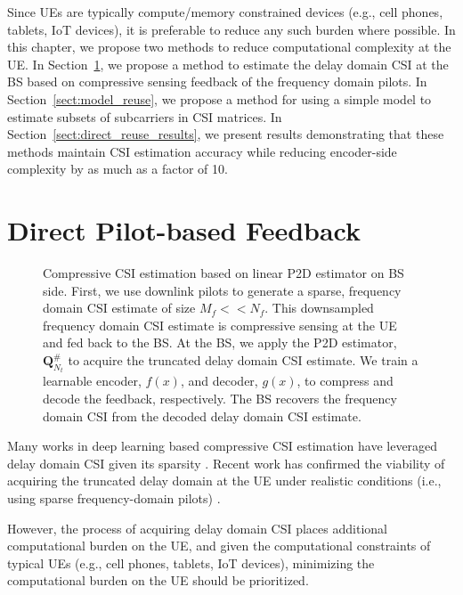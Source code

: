 Since UEs are typically compute/memory constrained devices (e.g., cell phones, tablets, IoT devices), it is preferable to reduce any such burden where possible. In this chapter, we propose two methods to reduce computational complexity at the UE. In Section~\ref{sect:direct_pilots}, we propose a method to estimate the delay domain CSI at the BS based on compressive sensing feedback of the frequency domain pilots. In Section~\ref{sect:model_reuse}, we propose a method for using a simple model to estimate subsets of subcarriers in CSI matrices. In Section~\ref{sect:direct_reuse_results}, we present results demonstrating that these methods maintain CSI estimation accuracy while reducing encoder-side complexity by as much as a factor of 10. 

\section{Direct Pilot-based Feedback} \label{sect:direct_pilots}

\begin{figure}[!hbtp]
    \centering
    {
      \fontsize{8pt}{8pt}
      \def\svgwidth{1.0\linewidth}
      
    }
    \caption{Compressive CSI estimation based on linear P2D estimator on BS side. First,
    we use downlink pilots to 
    generate a sparse, frequency domain CSI
    estimate 
    of size $M_f << N_f$. This downsampled frequency domain CSI estimate is compressive sensing at the UE
    and fed back to the BS.
    At the BS, we apply
    the P2D estimator, $\mathbf{Q}^{\#}_{N_t}$ \cite{ref:delRosario2022p2d} to acquire 
    the truncated
    delay domain CSI estimate.
    We train a
    learnable encoder, 
    $f(x)$,
    and decoder, $g(x)$, to compress and decode the feedback, respectively. The 
    BS recovers
    the frequency domain
    CSI from 
    the decoded 
    delay domain CSI estimate.}
    \label{fig:p2d_direct}
\end{figure}

Many works in deep learning based compressive CSI estimation 
have leveraged delay domain CSI given its sparsity \cite{ref:csinet}.
Recent work has confirmed the viability of acquiring the truncated delay domain 
at the UE under realistic conditions (i.e., using sparse frequency-domain pilots) \cite{ref:delRosario2022p2d}.

However, the process of acquiring delay domain CSI places additional 
computational burden on the UE, and given the computational constraints
of typical UEs (e.g., cell phones, tablets, IoT devices), minimizing the 
computational burden on the UE should be prioritized.

